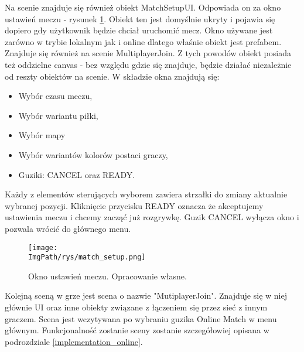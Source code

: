 \documentclass[a4paper,12pt,twoside,openany]{report}
\newcommand{\ImgPath}{.}
\begin{document}
Na scenie znajduje się również obiekt MatchSetupUI. Odpowiada on za okno ustawień meczu - rysunek \ref{match_setup}. Obiekt ten  jest domyślnie ukryty i pojawia się dopiero gdy użytkownik będzie chciał uruchomić mecz. Okno używane jest zarówno w trybie lokalnym jak i online dlatego właśnie obiekt jest prefabem. Znajduje się również na scenie MultiplayerJoin. Z tych powodów obiekt posiada też oddzielne canvas - bez względu gdzie się znajduje, będzie działać niezależnie od reszty obiektów na scenie. W składzie okna znajdują się:
\begin{itemize}
    \item Wybór czasu meczu,
    \item Wybór wariantu piłki,
    \item Wybór mapy
    \item Wybór wariantów kolorów postaci graczy,
    \item Guziki: CANCEL oraz READY.
\end{itemize}
Każdy z elementów sterujących wyborem zawiera strzałki do zmiany aktualnie wybranej pozycji. Kliknięcie przycisku READY oznacza że akceptujemy ustawienia meczu i chcemy zacząć już rozgrywkę. Guzik CANCEL wyłącza okno i pozwala wrócić do głównego menu.

\begin{figure}[H]
	\begin{center}
\centering
\texttt{[image: \\ImgPath/rys/match\_setup.png]}
\end{center}
	\caption{Okno ustawień meczu. Opracowanie własne.}
	\label{match_setup}
\end{figure}



Kolejną sceną w grze jest scena o nazwie "MutiplayerJoin". Znajduje się w niej głównie UI oraz inne obiekty związane z łączeniem się przez sieć z innym graczem. Scena jest wczytywana po wybraniu guzika Online Match w menu głównym. Funkcjonalność zostanie sceny zostanie szczegółowiej opisana w podrozdziale \ref{implementation_online}.
\end{document}
